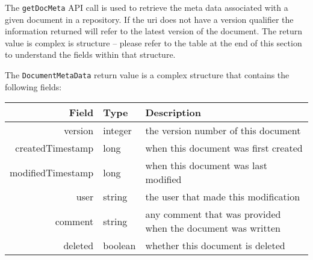 The \verb+getDocMeta+ API call is used to retrieve the meta data associated
with a given document in a repository. If the uri does not have a version
qualifier the information returned will refer to the latest version of the
document. The return value is complex is structure -- please refer to the
table at the end of this section to understand the fields within that
structure.

The \verb+DocumentMetaData+ return value is a complex structure that contains
the following fields:

\begin{table}[h]
\begin{center}
\begin{tabular}{rl p{8cm}}
  Field & Type & Description \\
  \hline
  version & integer & the version number of this document \\
  createdTimestamp & long & when this document was first created \\
  modifiedTimestamp & long & when this document was last modified \\
  user & string & the user that made this modification \\
  comment & string & any comment that was provided when the document was written \\
  deleted & boolean & whether this document is deleted \\
\end{tabular}
\end{center}
\end{table}
